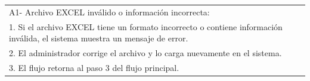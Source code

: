 \documentclass[stu, 12pt, letterpaper, donotrepeattitle, floatsintext, natbib]{apa7}
\begin{document}
\begin{longtable}{@{} p{16.5cm} @{}}
    A1- Archivo EXCEL inválido o información incorrecta:                                                                                                               \\
    \hspace{1cm}1. Si el archivo EXCEL tiene un formato incorrecto o contiene información inválida, el sistema muestra un mensaje de error.                            \\
    \hspace{1cm}2. El administrador corrige el archivo y lo carga nuevamente en el sistema.                                                                            \\
    \hspace{1cm}3. El flujo retorna al paso 3 del flujo principal.                                                                                                     \\ \bottomrule
\end{longtable}
\newpage
\end{document}
